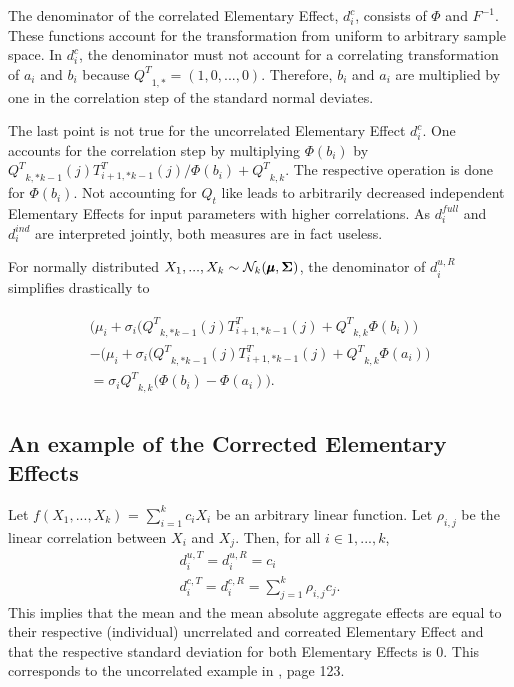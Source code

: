 \documentclass[a4paper,12pt]{article}
\begin{document}
\noindent
The denominator of the correlated Elementary Effect, $d_i^{c}$, consists of $\Phi$ and $F^{-1}$. These functions account for the transformation from uniform to arbitrary sample space. In $d_i^{c}$, the denominator must not account for a correlating transformation of $a_i$ and $b_i$ because ${Q^T}_{1,*} = (1, 0, ..., 0)$.  Therefore, $b_i$ and $a_i$ are multiplied by one in the correlation step of the standard normal deviates.

The last point is not true for the uncorrelated Elementary Effect $d_i^{c}$. One accounts for the correlation step by multiplying $\Phi(b_i)$ by ${Q^T}_{k,*k-1}(j)T_{i+1,*k-1}^T(j)/\Phi(b_i)+{Q^T}_{k,k}$. The respective operation is done for $\Phi(b_i)$. Not accounting for $Q_t$ like \cite{ge2017extending} leads to arbitrarily decreased independent Elementary Effects for input parameters with higher correlations. As $d_i^{full}$ and $d_i^{ind}$ are interpreted jointly, both measures are in fact useless.

For normally distributed $X_1, ..., X_k \sim \mathcal{N}_k(\pmb{\mu}, \bold{\Sigma})$, the denominator of $d_i^{u, R}$ simplifies drastically to

\begin{align}
\begin{split}
 \big(\mu_i + \sigma_i\big({Q^T}_{k,*k-1}(j)T_{i+1,*k-1}^T(j) + {Q^T}_{k,k} \Phi(b_i)\big) \\-  \big(\mu_i + \sigma_i\big({Q^T}_{k,*k-1}(j)T_{i+1,*k-1}^T(j) + {Q^T}_{k,k} \Phi(a_i)\big)\\= \sigma_i{Q^T}_{k,k}\big(\Phi(b_i)-\Phi(a_i)\big).
 \end{split}
\end{align}

\subsection{An example of the Corrected Elementary Effects}

Let $f(X_1, ..., X_k)$ = $\sum_{i = 1}^{k} c_i X_i$ be an arbitrary linear function. Let $\rho_{i,j}$ be the linear correlation between $X_i$ and $X_j$. Then, for all $i \in 1, ..., k$,
\begin{align}
d_i^{u,T} = d_i^{u,R} = c_i \\
d_i^{c,T} = d_i^{c,R} = \sum_{j = 1}^{k} \rho_{i,j} c_{j}.
\end{align}
This implies that the mean and the mean absolute aggregate effects are equal to their respective (individual) uncrrelated and correated Elementary Effect and that the respective standard deviation for both Elementary Effects is 0. This corresponds to the uncorrelated example in \cite{Saltelli.2008}, page 123.







\newpage

\end{document}
